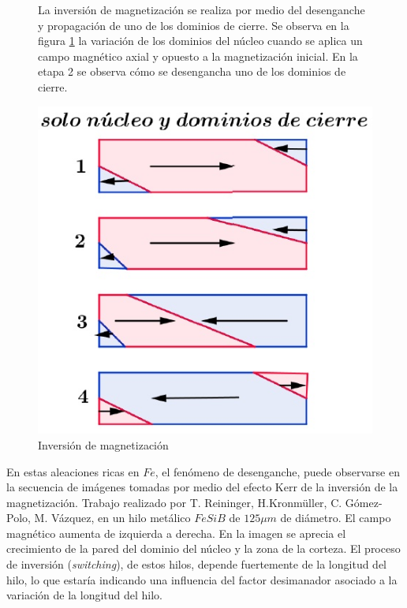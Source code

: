 \begin{figure}[H]
  \begin{minipage}[b]{0.47\textwidth}
  La inversión de magnetización se realiza por medio del desenganche y propagación de uno de los dominios de cierre. Se observa en la figura \ref{fig:312} la variación de los dominios del núcleo cuando se aplica un campo magnético axial y opuesto a la magnetización inicial. En la etapa 2 se observa cómo se desengancha uno de los dominios de cierre.
\vspace{3cm}
  \end{minipage}
  \hfill
  \begin{minipage}[b]{0.47\textwidth}
     \includegraphics[width=1.10\textwidth]{./Figures/fig312}
     \caption{Inversión de magnetización}
	\label{fig:312}
  \end{minipage}
\end{figure}

En estas aleaciones ricas en $Fe$, el fenómeno de desenganche, puede observarse en la secuencia de imágenes tomadas por medio del efecto Kerr de la inversión de la magnetización. Trabajo realizado por T. Reininger, H.Kronmüller, C. Gómez-Polo, M. Vázquez, en un hilo metálico $FeSiB$ de $125\mu m$ de diámetro. El campo magnético aumenta de izquierda a derecha. En la imagen se aprecia el crecimiento de la pared del dominio del núcleo y la zona de la corteza. El proceso de inversión (\textit{switching}), de estos hilos, depende fuertemente de la longitud del hilo, lo que estaría indicando una influencia del factor desimanador asociado a la variación de la longitud del hilo.


